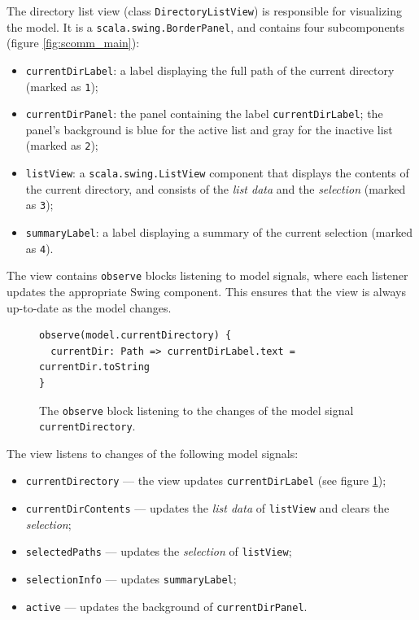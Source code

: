 The directory list view (class \texttt{DirectoryListView}) is responsible for visualizing the model. It is a \texttt{scala.swing.BorderPanel}, and contains four subcomponents (figure \ref{fig:scomm_main}):
\begin{itemize}
\item \texttt{currentDirLabel}: a label displaying the full path of the current directory (marked as \texttt{1});
\item \texttt{currentDirPanel}: the panel containing the label \texttt{currentDirLabel}; the panel's background is blue for the active list and gray for the inactive list (marked as \texttt{2});
\item \texttt{listView}: a \texttt{scala.swing.ListView} component that displays the contents of the current directory, and consists of the \emph{list data} and the \emph{selection} (marked as \texttt{3});
\item \texttt{summaryLabel}: a label displaying a summary of the current selection (marked as \texttt{4}).
\end{itemize}

The view contains \texttt{observe} blocks listening to model signals, where each listener updates the appropriate Swing component. This ensures that the view is always up-to-date as the model changes.

\begin{figure}[h!]
\centering
\begin{lstlisting}[frame=single]
observe(model.currentDirectory) {
  currentDir: Path => currentDirLabel.text = currentDir.toString
}
\end{lstlisting}
\caption{The \texttt{observe} block listening to the changes of the model signal \texttt{currentDirectory}.}
\label{fig:scomm_observe_currentDir}
\end{figure}

The view listens to changes of the following model signals:
\begin{itemize}
\item \texttt{currentDirectory} --- the view updates \texttt{currentDirLabel} (see figure \ref{fig:scomm_observe_currentDir});
\item \texttt{currentDirContents} --- updates the \emph{list data} of \texttt{listView} and clears the \emph{selection};
\item \texttt{selectedPaths} --- updates the \emph{selection} of \texttt{listView};
\item \texttt{selectionInfo} --- updates \texttt{summaryLabel};
\item \texttt{active} --- updates the background of \texttt{currentDirPanel}.
\end{itemize}


